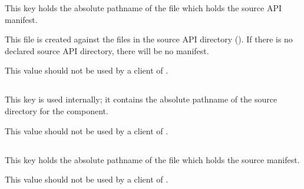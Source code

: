 This key holds the absolute pathname of the file which holds the
source API \mtree manifest.

This file is created against the files in the source API directory
().  If there is no declared source API
directory, there will be no manifest.

This value should not be used by a client of \lmsbw.

\subsection{}
This key is used internally; it contains the absolute pathname of the
source directory for the component.

This value should not be used by a client of \lmsbw.

\subsection{}

This key holds the absolute pathname of the file which holds the
source \mtree manifest.

This value should not be used by a client of \lmsbw.



